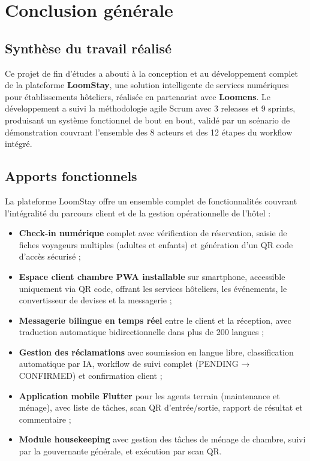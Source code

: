 
\chapter*{Conclusion générale}

\section*{Synthèse du travail réalisé}

Ce projet de fin d'études a abouti à la conception et au développement complet de la plateforme \textbf{LoomStay}, une solution intelligente de services numériques pour établissements hôteliers, réalisée en partenariat avec \textbf{Loomens}. Le développement a suivi la méthodologie agile Scrum avec 3 releases et 9 sprints, produisant un système fonctionnel de bout en bout, validé par un scénario de démonstration couvrant l'ensemble des 8 acteurs et des 12 étapes du workflow intégré.

\section*{Apports fonctionnels}

La plateforme LoomStay offre un ensemble complet de fonctionnalités couvrant l'intégralité du parcours client et de la gestion opérationnelle de l'hôtel :

\begin{itemize}
  \item \textbf{Check-in numérique} complet avec vérification de réservation, saisie de fiches voyageurs multiples (adultes et enfants) et génération d'un QR code d'accès sécurisé ;
  \item \textbf{Espace client chambre PWA installable} sur smartphone, accessible uniquement via QR code, offrant les services hôteliers, les événements, le convertisseur de devises et la messagerie ;
  \item \textbf{Messagerie bilingue en temps réel} entre le client et la réception, avec traduction automatique bidirectionnelle dans plus de 200 langues ;
  \item \textbf{Gestion des réclamations} avec soumission en langue libre, classification automatique par IA, workflow de suivi complet (PENDING → CONFIRMED) et confirmation client ;
  \item \textbf{Application mobile Flutter} pour les agents terrain (maintenance et ménage), avec liste de tâches, scan QR d'entrée/sortie, rapport de résultat et commentaire ;
  \item \textbf{Module housekeeping} avec gestion des tâches de ménage de chambre, suivi par la gouvernante générale, et exécution par scan QR.
\end{itemize}

